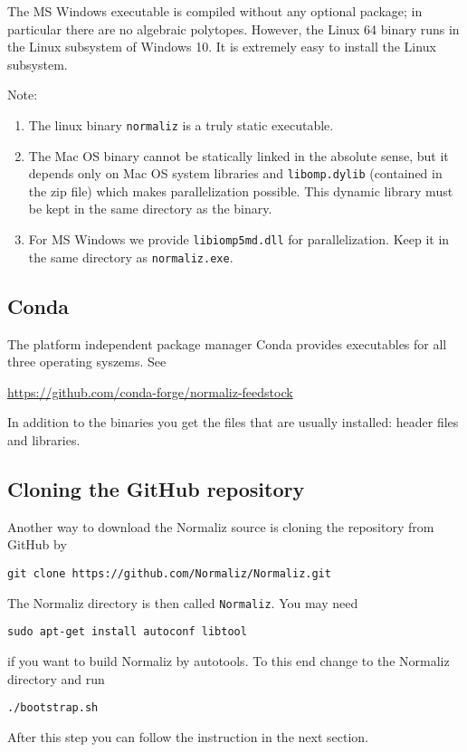 \documentclass[12pt,a4paper]{scrartcl}
\theoremstyle{definition}
\begin{document}
The MS Windows executable is compiled without any optional package; in particular there are no algebraic polytopes. However, the Linux 64 binary runs in the Linux subsystem of Windows 10. It is extremely easy to install the Linux subsystem.

Note:
\begin{enumerate}
\item The linux binary \verb|normaliz| is a truly static executable. 

\item The Mac OS binary cannot be statically linked in the absolute sense, but it depends only on Mac OS system libraries and \verb|libomp.dylib| (contained in the zip file) which makes parallelization possible. This dynamic library must be kept in the same directory as the binary.

\item For MS Windows we provide \verb|libiomp5md.dll| for parallelization. Keep it in the same directory as \verb|normaliz.exe|.
\end{enumerate}

\subsection{Conda}

The platform independent package manager Conda provides executables for all three operating syszems. See
\begin{center}
	\url{https://github.com/conda-forge/normaliz-feedstock}
\end{center}
In addition to the binaries you get the files that are usually installed: header files and libraries.

\subsection{Cloning the GitHub repository}

Another way to download the Normaliz source is cloning the repository from GitHub by
\begin{Verbatim}
git clone https://github.com/Normaliz/Normaliz.git
\end{Verbatim}
The Normaliz directory is then called \verb|Normaliz|. You may need
\begin{Verbatim}
sudo apt-get install autoconf libtool
\end{Verbatim}
if you want to build Normaliz by autotools. To this end change to the Normaliz directory and run
\begin{Verbatim}
./bootstrap.sh
\end{Verbatim}
After this step you can follow the instruction in the next section.
\end{document}
